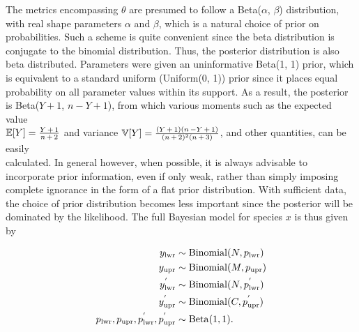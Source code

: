 \documentclass[12pt]{article}
\begin{document}
The metrics encompassing $\theta$ are presumed to follow a Beta($\alpha$, $\beta$) distribution, with real shape parameters $\alpha$ and $\beta$, which is a natural choice of prior on probabilities. Such a scheme is quite convenient since the beta distribution is conjugate to the binomial distribution. Thus, the posterior distribution is also beta distributed. Parameters were given an uninformative Beta(1, 1) prior, which is equivalent to a standard uniform (Uniform(0, 1)) prior since it places equal probability on all parameter values within its support. As a result, the posterior is Beta($Y + 1$, $n - Y + 1$), from which various moments such as the expected value \\ $\mathbb{E}[Y] = \frac{Y \hspace{0.5mm} + \hspace{0.5mm} 1}{n \hspace{0.5mm} + \hspace{0.5mm} 2}$ and variance $\mathbb{V}[Y] = \frac{(Y \hspace{0.5mm} + \hspace{0.5mm} 1)(n \hspace{0.5mm} - Y \hspace{0.5mm} + \hspace{0.5mm} 1)}{(n \hspace{0.5mm} + \hspace{0.5mm} 2)^2(n \hspace{0.5mm} + \hspace{0.5mm} 3)}$, and other quantities, can be easily \\ calculated. In general however, when possible, it is always advisable to incorporate prior information, even if only weak, rather than simply imposing complete ignorance in the form of a flat prior distribution. With sufficient data, the choice of prior distribution becomes less important since the posterior will be dominated by the likelihood.  The full Bayesian model for species $x$ is thus given by

\begin{align}
\notag y_\mathrm{lwr} &\sim \mathrm{Binomial}(N, p_\mathrm{lwr}) \\ 
\notag y_\mathrm{upr} &\sim \mathrm{Binomial}(M, p_\mathrm{upr}) \\ 
y^{'}_\mathrm{lwr} &\sim \mathrm{Binomial}(N, p^{'}_\mathrm{lwr}) \\ 
 \notag y^{'}_\mathrm{upr} &\sim \mathrm{Binomial}(C, p^{'}_\mathrm{upr}) \\ 
\notag p_\mathrm{lwr}, p_\mathrm{upr}, p^{'}_\mathrm{lwr}, p^{'}_\mathrm{upr}
&\sim \mathrm{Beta}(1, 1).
\end{align}
\end{document}
